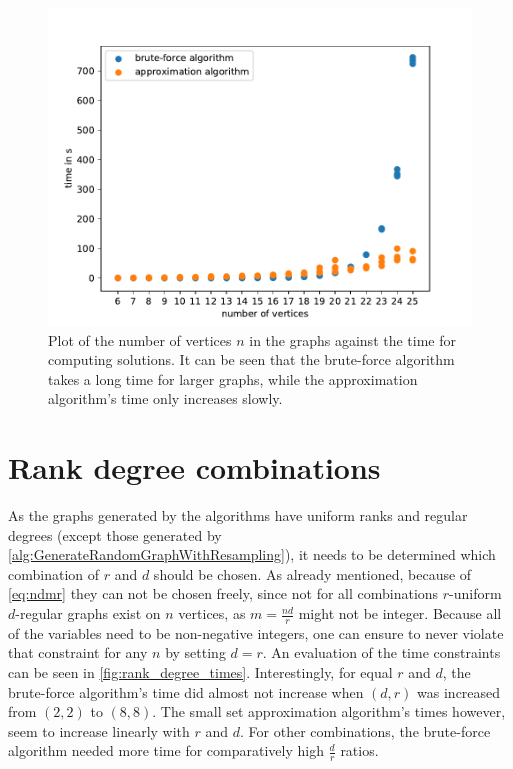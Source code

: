 \begin{figure}[htpb]
	\centering
	\includegraphics[scale=0.8]{figures/number_vertices_all_logs.pdf}
	\caption[Plot graph size against time]{Plot of the number of vertices $n$ in the graphs against the time for computing solutions. It can be seen that the brute-force algorithm takes a long time for larger graphs, while the approximation algorithm's time only increases slowly.\label{fig:no_vertices_time}}
\end{figure}


\section{Rank degree combinations}

As the graphs generated by the algorithms have uniform ranks and regular degrees (except those generated by \cref{alg:GenerateRandomGraphWithResampling}), it needs to be determined which combination of $r$ and $d$ should be chosen. As already mentioned, because of \cref{eq:ndmr} they can not be chosen freely, since not for all combinations $r$-uniform $d$-regular graphs exist on $n$ vertices, as $m = \frac{nd}{r}$ might not be integer. 
Because all of the variables need to be non-negative integers, one can ensure to never violate that constraint for any $n$ by setting $d=r$. An evaluation of the time constraints can be seen in \cref{fig:rank_degree_times}. Interestingly, for equal $r$ and $d$, the brute-force algorithm's time did almost not increase when $(d,r)$ was increased from $(2,2)$ to $(8,8)$. The small set approximation algorithm's times however, seem to increase linearly with $r$ and $d$. For other combinations, the brute-force algorithm needed more time for comparatively high $\frac{d	}{r}$ ratios.

